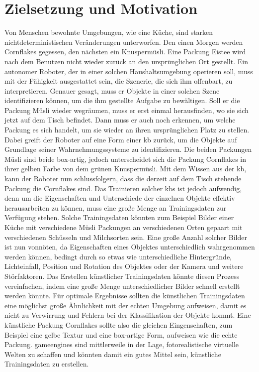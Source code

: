 \graphicspath{{./images/}}      
\def\CHAPTERONE{./chapters/Chapter-1} 

\chapter{Zielsetzung und Motivation}
\label{chap:motivation}
%	

\glsresetall

Von Menschen bewohnte Umgebungen, wie eine Küche, sind starken nichtdeterministischen Veränderungen unterworfen. Den einen Morgen werden Cornflakes gegessen, den nächsten ein Knuspermüsli. Eine Packung Eistee wird nach dem Benutzen nicht wieder zurück an den ursprünglichen Ort gestellt. Ein autonomer Roboter, der in einer solchen Haushaltsumgebung operieren soll, muss mit der Fähigkeit ausgestattet sein, die Szenerie, die sich ihm offenbart, zu interpretieren. Genauer gesagt, muss er Objekte in einer solchen Szene identifizieren können, um die ihm gestellte Aufgabe zu bewältigen. Soll er die Packung Müsli wieder wegräumen, muss er erst einmal herausfinden, wo sie sich jetzt auf dem Tisch befindet. Dann muss er auch noch erkennen, um welche Packung es sich handelt, um sie wieder an ihren ursprünglichen Platz zu stellen. Dabei greift der Roboter auf eine Form einer \gls{kb} zurück, um die Objekte auf Grundlage seiner Wahrnehmungssysteme zu identifizieren. Die beiden  Packungen Müsli sind beide box-artig, jedoch unterscheidet sich die Packung Cornflakes in ihrer gelben Farbe von dem grünen Knuspermüsli. Mit dem Wissen aus der \gls{kb}, kann der Roboter nun schlussfolgern, dass die derzeit auf dem Tisch stehende Packung die Cornflakes sind. Das Trainieren solcher \glspl{kb} ist jedoch aufwendig, denn um die Eigenschaften und Unterschiede der einzelnen Objekte effektiv herausarbeiten zu können, muss eine große Menge an Trainingsdaten zur Verfügung stehen. Solche Trainingsdaten könnten zum Beispiel Bilder einer Küche mit verschiedene Müsli Packungen an verschiedenen Orten gepaart mit verschiedenen Schüsseln und Milchsorten sein. Eine große Anzahl solcher Bilder ist nun vonnöten, da Eigenschaften eines Objektes unterschiedlich wahrgenommen werden können, bedingt durch so etwas wie unterschiedliche Hintergründe, Lichteinfall, Position und Rotation des Objektes oder der Kamera und weitere Störfaktoren. \newline
Das Erstellen künstlicher Trainingsdaten könnte diesen Prozess vereinfachen, indem eine große Menge unterschiedlicher Bilder schnell erstellt werden könnte. Für optimale Ergebnisse sollten die künstlichen Trainingsdaten eine möglichst große Ähnlichkeit mit der echten Umgebung aufweisen, damit es nicht zu Verwirrung und Fehlern bei der Klassifikation der Objekte kommt. Eine künstliche Packung Cornflakes sollte also die gleichen Eingenschaften, zum Beispiel eine gelbe Textur und eine box-artige Form, aufweisen wie die echte Packung. \glspl{gameengine} sind mittlerweile in der Lage, fotorealistische virtuelle Welten zu schaffen und könnten damit ein gutes Mittel sein, künstliche Trainingsdaten zu erstellen.  

